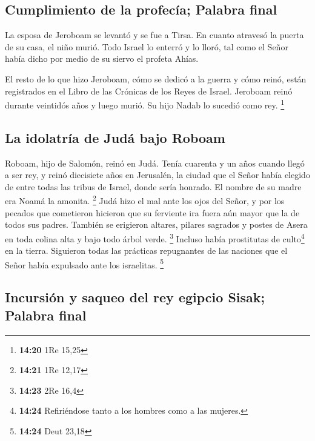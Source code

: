 \hypertarget{cumplimiento-de-la-profecuxeda-palabra-final}{%
\subsection{Cumplimiento de la profecía; Palabra
final}\label{cumplimiento-de-la-profecuxeda-palabra-final}}

 La esposa de Jeroboam se levantó y se fue a Tirsa. En
cuanto atravesó la puerta de su casa, el niño murió. 
Todo Israel lo enterró y lo lloró, tal como el Señor había dicho por
medio de su siervo el profeta Ahías.

 El resto de lo que hizo Jeroboam, cómo se dedicó a la
guerra y cómo reinó, están registrados en el Libro de las Crónicas de
los Reyes de Israel.  Jeroboam reinó durante veintidós
años y luego murió. Su hijo Nadab lo sucedió como rey. \footnote{\textbf{14:20}
  1Re 15,25}

\hypertarget{la-idolatruxeda-de-juduxe1-bajo-roboam}{%
\subsection{La idolatría de Judá bajo
Roboam}\label{la-idolatruxeda-de-juduxe1-bajo-roboam}}

 Roboam, hijo de Salomón, reinó en Judá. Tenía cuarenta y
un años cuando llegó a ser rey, y reinó diecisiete años en Jerusalén, la
ciudad que el Señor había elegido de entre todas las tribus de Israel,
donde sería honrado. El nombre de su madre era Noamá la amonita.
\footnote{\textbf{14:21} 1Re 12,17}  Judá hizo el mal
ante los ojos del Señor, y por los pecados que cometieron hicieron que
su ferviente ira fuera aún mayor que la de todos sus padres.
 También se erigieron altares, pilares sagrados y postes
de Asera en toda colina alta y bajo todo árbol verde. \footnote{\textbf{14:23}
  2Re 16,4}  Incluso había prostitutas de
culto\footnote{\textbf{14:24} Refiriéndose tanto a los hombres como a
  las mujeres.} en la tierra. Siguieron todas las prácticas repugnantes
de las naciones que el Señor había expulsado ante los israelitas.
\footnote{\textbf{14:24} Deut 23,18}

\hypertarget{incursiuxf3n-y-saqueo-del-rey-egipcio-sisak-palabra-final}{%
\subsection{Incursión y saqueo del rey egipcio Sisak; Palabra
final}\label{incursiuxf3n-y-saqueo-del-rey-egipcio-sisak-palabra-final}}

